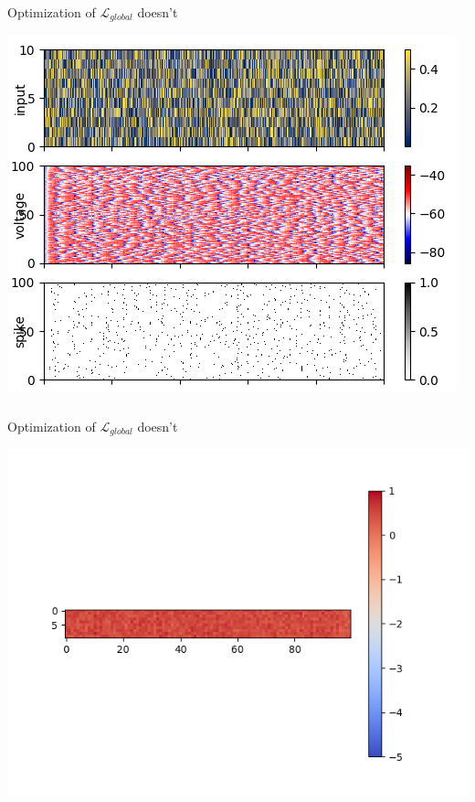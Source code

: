 \documentclass{beamer}
\begin{document}
\begin{frame}[plain]
\frametitle{} 

Optimization of $\mathcal{L}_{global}$ doesn't

\begin{center}
\includegraphics[scale=0.65]{global-traces}
\end{center}

\end{frame}

\begin{frame}[plain]
\frametitle{} 

Optimization of $\mathcal{L}_{global}$ doesn't

\begin{center}
\includegraphics[scale=0.65]{global-in-weights}
\end{center}

\end{frame}
\end{document}
